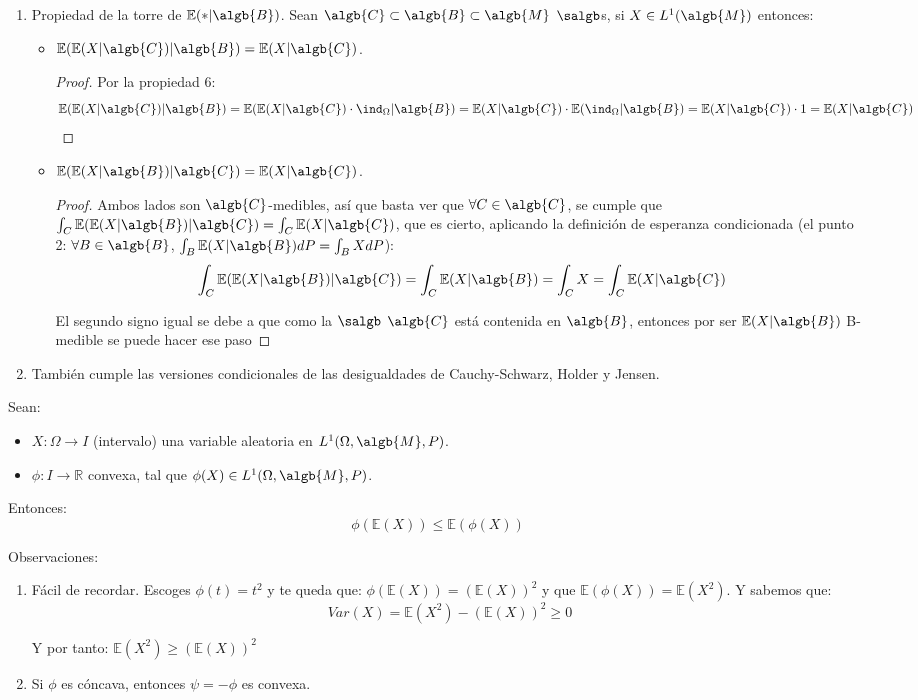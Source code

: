\documentclass{apuntes}
\begin{document}
\begin{enumerate}
\item Propiedad de la torre de $\mathbb{E}(*|\algb{B})$. Sean $\algb{C} \subset \algb{B} \subset \algb{M}$ $\salgb$s, si $X \in L^ 1(\algb{M})$ entonces:
\begin{itemize}
\item $\mathbb{E}(\mathbb{E}(X|\algb{C})|\algb{B}) = \mathbb{E}(X|\algb{C})$.
\begin{proof}
Por la propiedad 6:
\[
\mathbb{E}(\mathbb{E}(X|\algb{C})|\algb{B}) = \mathbb{E}(\mathbb{E}(X|\algb{C}) \cdot \ind_{\Omega}|\algb{B}) = \mathbb{E}(X|\algb{C}) \cdot \mathbb{E}(\ind_{\Omega}|\algb{B}) = \mathbb{E}(X|\algb{C}) \cdot 1 = \mathbb{E}(X|\algb{C})
\]
\end{proof}
\item $\mathbb{E}(\mathbb{E}(X|\algb{B})|\algb{C}) = \mathbb{E}(X|\algb{C})$.
\begin{proof}
Ambos lados son $\algb{C}$-medibles, así que basta ver que $\forall C \in \algb{C}$, se cumple que $\int_C \mathbb{E}(\mathbb{E}(X|\algb{B})|\algb{C}) = \int_C \mathbb{E}(X|\algb{C})$, que es cierto, aplicando la definición de esperanza condicionada (el punto 2: $\forall B \in \algb{B}$, $\int_{B}\mathbb{E}(X|\algb{B})dP=\int_{B}XdP$):
\[
\int_C \mathbb{E}(\mathbb{E}(X|\algb{B})|\algb{C}) = \int_C \mathbb{E}(X|\algb{B}) = \int_C X = \int_C \mathbb{E}(X|\algb{C})
\]

El segundo signo igual se debe a que como la $\salgb$ $\algb{C}$ está contenida en $\algb{B}$, entonces por ser $\mathbb{E}(X|\algb{B})$ B-medible se puede hacer ese paso

\end{proof}
\end{itemize}
\item También cumple las versiones condicionales de las desigualdades de Cauchy-Schwarz, Holder y Jensen.
\end{enumerate}

\begin{defn}
Sean:
\begin{itemize}
\item $X: \Omega \rightarrow I$ (intervalo) una variable aleatoria en $L^1(\Omega, \algb{M},P)$.
\item $\phi: I \rightarrow \mathbb{R}$ convexa, tal que $\phi(X) \in L^1(\Omega,\algb{M},P)$.
\end{itemize}
Entonces:
\[
\phi(\mathbb{E}(X)) \leq \mathbb{E}(\phi(X))
\]

Observaciones:
\begin{enumerate}
\item Fácil de recordar. Escoges $\phi(t)=t^2$ y te queda que: $\phi(\mathbb{E}(X))=(\mathbb{E}(X))^2$ y que  $\mathbb{E}(\phi(X)) = \mathbb{E}(X^2)$. Y sabemos que:
\[
Var(X) = \mathbb{E}(X^2) - (\mathbb{E}(X))^2 \geq 0
\]

Y por tanto: $\mathbb{E}(X^2) \geq (\mathbb{E}(X))^2$
\item Si $\phi$ es cóncava, entonces $\psi = -\phi$ es convexa.
\end{enumerate}
\end{defn}
\end{document}
